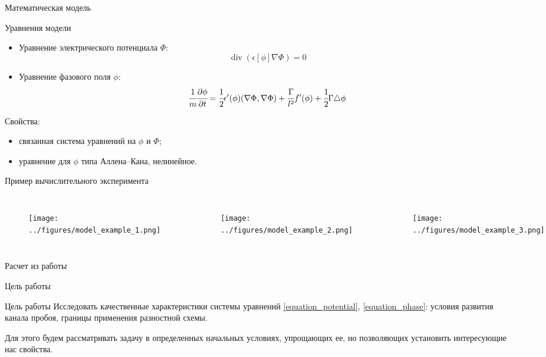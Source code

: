 \documentclass{beamer}
\DeclareMathOperator{\Div}{div}
\begin{document}
\begin{frame}{Математическая модель}
\vspace{-0.5cm}
\begin{block}{Уравнения модели}
\begin{itemize}
	\item Уравнение электрического потенциала $\Phi$:
	\begin{equation}
		\Div(\epsilon[\phi] \nabla \Phi) = 0
		\label{equation_potential}
	\end{equation}
	\item Уравнение фазового поля $\phi$:
	\begin{equation}
		\cfrac{1}{m} \cfrac{\partial \phi}{\partial t} = \cfrac{1}{2} \epsilon'(\phi)
		(\nabla \Phi, \nabla \Phi) + \cfrac{\Gamma}{l^2} f'(\phi) +
		\cfrac{1}{2} \Gamma \triangle \phi
		\label{equation_phase}
	\end{equation}
\end{itemize}
\end{block}
Свойства:
\begin{itemize}
	\item связанная система уравнений на $\phi$ и $\Phi$;
	\item уравнение для $\phi$ типа Аллена--Кана, нелинейное.
\end{itemize}
\end{frame}


\begin{frame}{Пример вычислительного эксперимента}
\begin{columns}
\begin{figure}
	\texttt{[image: ../figures/model\_example\_1.png]}
\end{figure}
\begin{figure}
	\texttt{[image: ../figures/model\_example\_2.png]}
\end{figure}
\begin{figure}
	\texttt{[image: ../figures/model\_example\_3.png]}
\end{figure}
\end{columns}
\begin{center}
	Расчет из работы \cite{experiment_2d}
\end{center}
\end{frame}


\begin{frame}{Цель работы}
\begin{block}{Цель работы}
	Исследовать качественные характеристики системы уравнений \eqref{equation_potential},
	\eqref{equation_phase}: условия развития канала пробоя, границы применения разностной
	схемы.
\end{block}
Для этого будем рассматривать задачу в определенных начальных условиях, упрощающих ее, но
позволяющих установить интересующие нас свойства.
\end{frame}
\end{document}
